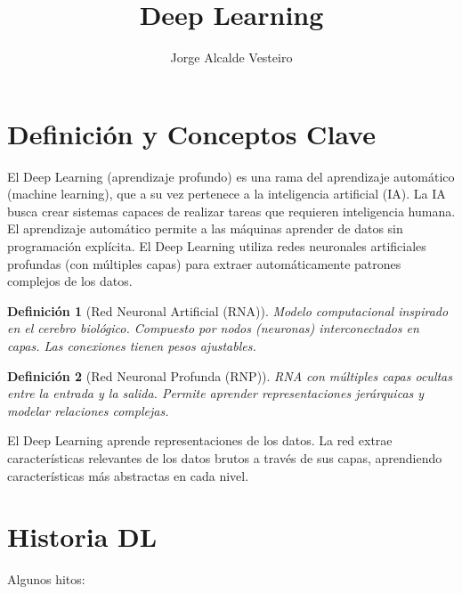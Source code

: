 \documentclass{article}
\title{Deep Learning}
\author{Jorge Alcalde Vesteiro}
\date{}
\newtheorem{definition}{Definición}[section]
\begin{document}
\maketitle

\section{Definición y Conceptos Clave}

El Deep Learning (aprendizaje profundo) es una rama del aprendizaje automático (machine learning), que a su vez pertenece a la inteligencia artificial (IA). La IA busca crear sistemas capaces de realizar tareas que requieren inteligencia humana. El aprendizaje automático permite a las máquinas aprender de datos sin programación explícita. El Deep Learning utiliza redes neuronales artificiales profundas (con múltiples capas) para extraer automáticamente patrones complejos de los datos.

\begin{definition}[Red Neuronal Artificial (RNA)]
Modelo computacional inspirado en el cerebro biológico. Compuesto por nodos (neuronas) interconectados en capas. Las conexiones tienen pesos ajustables.
\end{definition}

\begin{definition}[Red Neuronal Profunda (RNP)]
RNA con múltiples capas ocultas entre la entrada y la salida. Permite aprender representaciones jerárquicas y modelar relaciones complejas.
\end{definition}

El Deep Learning aprende representaciones de los datos. La red extrae características relevantes de los datos brutos a través de sus capas, aprendiendo características más abstractas en cada nivel.

\section{Historia DL}

Algunos hitos:
\end{document}
